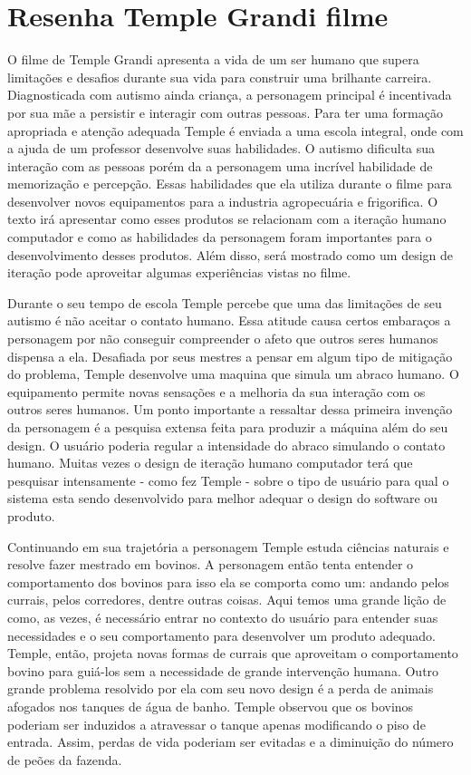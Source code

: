 \setcounter{secnumdepth}{0}
\section{Resenha Temple Grandi filme}
O filme de Temple Grandi apresenta a vida de um ser humano que supera
limitações e desafios durante sua vida para construir uma brilhante carreira.
Diagnosticada com autismo ainda criança, a personagem principal é incentivada
por sua mãe a persistir e interagir com outras pessoas. Para ter uma formação
apropriada e atenção adequada Temple é enviada a uma escola integral, onde com
a ajuda de um professor desenvolve suas habilidades. O autismo dificulta 
sua interação com as pessoas porém da a personagem uma incrível habilidade de 
memorização e percepção. Essas habilidades que ela utiliza durante o filme
para desenvolver novos equipamentos para a industria agropecuária e frigorifica.
O texto irá apresentar como esses produtos se relacionam com a iteração humano
computador e como as habilidades da personagem foram importantes para o desenvolvimento
desses produtos. Além disso, será mostrado como um design de iteração pode aproveitar
algumas experiências vistas no filme.

Durante o seu tempo de escola Temple percebe que uma das limitações de seu autismo
é não aceitar o contato humano. Essa atitude causa certos embaraços a personagem
por não conseguir compreender o afeto que outros seres humanos dispensa a ela. 
Desafiada por seus mestres a pensar em algum tipo de mitigação do problema, Temple
desenvolve uma maquina que simula um abraco humano. O equipamento permite novas sensações
e a melhoria da sua interação com os outros seres humanos. Um ponto importante 
a ressaltar dessa primeira invenção da personagem é a pesquisa extensa feita para
produzir a máquina além do seu design. O usuário poderia regular a intensidade do abraco
simulando o contato humano. Muitas vezes o design de iteração humano computador
terá que pesquisar intensamente - como fez Temple -  sobre o tipo de usuário para 
qual o sistema esta sendo desenvolvido para melhor adequar o design do software ou produto.

Continuando em sua trajetória a personagem Temple estuda ciências naturais e resolve
fazer mestrado em bovinos. A personagem então tenta entender o comportamento dos bovinos
para isso ela se comporta como um: andando pelos currais, pelos corredores, dentre outras
coisas. Aqui temos uma grande lição de como, as vezes, é necessário entrar no contexto
do usuário para entender suas necessidades e o seu comportamento para desenvolver um
produto adequado. Temple, então, projeta novas formas de currais que aproveitam o 
comportamento bovino para guiá-los sem a necessidade de grande intervenção humana.
Outro grande problema resolvido por ela com seu novo design é a perda de animais
afogados nos tanques de água de banho. Temple observou que os bovinos poderiam ser induzidos
a atravessar o tanque apenas modificando o piso de entrada. Assim, perdas de vida
poderiam ser evitadas e a diminuição do número de peões da fazenda.

